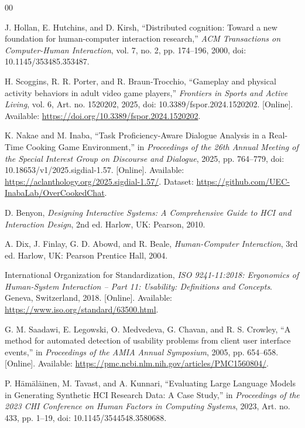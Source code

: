 \documentclass[conference]{IEEEtran}
\begin{document}
\begin{thebibliography}{00}

J. Hollan, E. Hutchins, and D. Kirsh, ``Distributed cognition: Toward a new foundation for human-computer interaction research,'' \textit{ACM Transactions on Computer-Human Interaction}, vol. 7, no. 2, pp. 174--196, 2000, doi: 10.1145/353485.353487.

H. Scoggins, R. R. Porter, and R. Braun-Trocchio, ``Gameplay and physical activity behaviors in adult video game players,'' \textit{Frontiers in Sports and Active Living}, vol. 6, Art. no. 1520202, 2025, doi: 10.3389/fspor.2024.1520202. [Online]. Available: \url{https://doi.org/10.3389/fspor.2024.1520202}.

K. Nakae and M. Inaba, ``Task Proficiency-Aware Dialogue Analysis in a Real-Time Cooking Game Environment,'' in \textit{Proceedings of the 26th Annual Meeting of the Special Interest Group on Discourse and Dialogue}, 2025, pp. 764--779, doi: 10.18653/v1/2025.sigdial-1.57. [Online]. Available: \url{https://aclanthology.org/2025.sigdial-1.57/}. Dataset: \url{https://github.com/UEC-InabaLab/OverCookedChat}.

D. Benyon, \textit{Designing Interactive Systems: A Comprehensive Guide to HCI and Interaction Design}, 2nd ed. Harlow, UK: Pearson, 2010.

A. Dix, J. Finlay, G. D. Abowd, and R. Beale, \textit{Human-Computer Interaction}, 3rd ed. Harlow, UK: Pearson Prentice Hall, 2004.

International Organization for Standardization, \textit{ISO 9241-11:2018: Ergonomics of Human-System Interaction -- Part 11: Usability: Definitions and Concepts}. Geneva, Switzerland, 2018. [Online]. Available: \url{https://www.iso.org/standard/63500.html}.

G. M. Saadawi, E. Legowski, O. Medvedeva, G. Chavan, and R. S. Crowley, ``A method for automated detection of usability problems from client user interface events,'' in \textit{Proceedings of the AMIA Annual Symposium}, 2005, pp. 654--658. [Online]. Available: \url{https://pmc.ncbi.nlm.nih.gov/articles/PMC1560804/}.

P. Hämäläinen, M. Tavast, and A. Kunnari, ``Evaluating Large Language Models in Generating Synthetic HCI Research Data: A Case Study,'' in \textit{Proceedings of the 2023 CHI Conference on Human Factors in Computing Systems}, 2023, Art. no. 433, pp. 1--19, doi: 10.1145/3544548.3580688.


\end{thebibliography}
\end{document}
